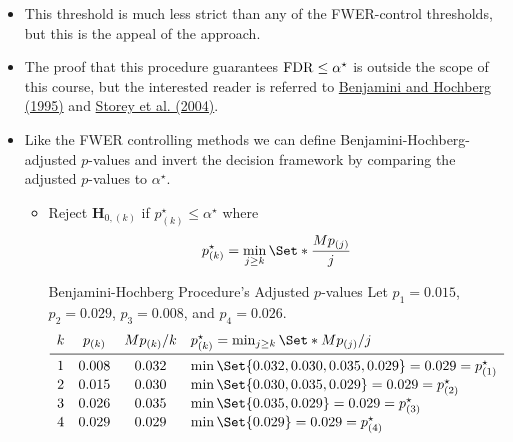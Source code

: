 \begin{itemize}
          \begin{Example}{Four-test Example --- Benjamini-Hochberg Procedure}{}
              Let $ p_1=0.015 $, $ p_2=0.029 $, $ p_3=0.008 $, and $ p_4=0.026 $. Suppose that we wish to ensure
              $ \FDR\le \alpha^\star=0.05 $. Since all $ p $-values fall below the purple line in~,
              we reject all four null hypotheses.
          \end{Example}
    \item This threshold is much less strict than any of the FWER-control thresholds, but this is the appeal of
          the approach.
    \item The proof that this procedure guarantees $ \operatorname{FDR}\le \alpha^\star $ is outside the scope of this course, but the
          interested reader is referred to \href{https://www.jstor.org/stable/2346101?seq=1#metadata_info_tab_contents}{Benjamini and Hochberg (1995)}
          and \href{https://rss.onlinelibrary.wiley.com/doi/abs/10.1111/j.1467-9868.2004.00439.x}{Storey et al. (2004)}.
    \item Like the FWER controlling methods we can define Benjamini-Hochberg-adjusted $p$-values and invert
          the decision framework by comparing the adjusted $ p $-values to $ \alpha^\star $.
          \begin{itemize}
              \item Reject $ \mathbf{H}_{0,(k)} $ if $ p_{(k)}^\star\le \alpha^\star $ where
                    \[ p_{(k)}^\star=\min_{j\ge k}\Set*{\frac{Mp_{(j)}}{j}} \]
                    \begin{Example}{Benjamini-Hochberg Procedure's Adjusted $ p $-values}{}
                        Let $ p_1=0.015 $, $ p_2=0.029 $, $ p_3=0.008 $, and $ p_4=0.026 $.
                        \[ \begin{array}{cccl}
                                k & p_{(k)} & M p_{(k)}/k & p_{(k)}^\star=\min_{j\ge k}\Set*{Mp_{(j)}/j}          \\
                                \midrule
                                1 & 0.008   & 0.032       & \min\Set{0.032,0.030,0.035,0.029}=0.029=p_{(1)}^\star \\
                                2 & 0.015   & 0.030       & \min\Set{0.030,0.035,0.029}=0.029=p_{(2)}^\star       \\
                                3 & 0.026   & 0.035       & \min\Set{0.035,0.029}=0.029=p_{(3)}^\star             \\
                                4 & 0.029   & 0.029       & \min\Set{0.029}=0.029=p_{(4)}^\star

\end{array}\]
\end{Example}
\end{itemize}
\end{itemize}
